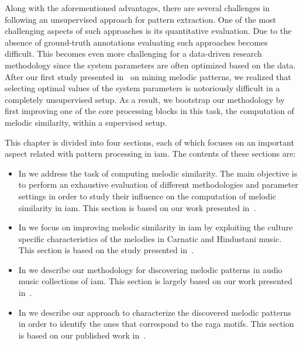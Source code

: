 Along with the aforementioned advantages, there are several challenges in following an unsupervised approach for pattern extraction. One of the most challenging aspects of such approaches is its quantitative evaluation. Due to the absence of ground-truth annotations evaluating such approaches becomes difficult. This becomes even more challenging for a data-driven research methodology since the system parameters are often optimized based on the data. After our first study presented in~\cite{gulati_SITIS_2014} on mining melodic patterns, we realized that selecting optimal values of the system parameters is notoriously difficult in a completely unsupervised setup. As a result, we bootstrap our methodology by first improving one of the core processing blocks in this task, the computation of melodic similarity, within a supervised setup. 

This chapter is divided into four sections, each of which focuses on an important aspect related with pattern processing in \gls{iam}. The contents of these sections are:
\begin{itemize}
	\item In  we address the task of computing melodic similarity. The main objective is to perform an exhaustive evaluation of different methodologies and parameter settings in order to study their influence on the computation of melodic similarity  in \gls{iam}. This section is based on our work presented in~\cite{gulati_ICASSP2015}.
	\item In  we focus on improving melodic similarity in \gls{iam} by exploiting the culture specific characteristics of the melodies in Carnatic and Hindustani music. This section is based on the study presented in~\cite{gulati_ISMIR_2015}.
	\item In  we describe our methodology for discovering melodic patterns in audio music collections of \gls{iam}. This section is largely based on our work presented in~\cite{gulati_SITIS_2014}.
	\item In  we describe our approach to characterize the discovered melodic patterns in order to identify the ones that correspond to the \gls{raga} motifs. This section is based on our published work in~\cite{gulati_communities_2016}.
\end{itemize}




